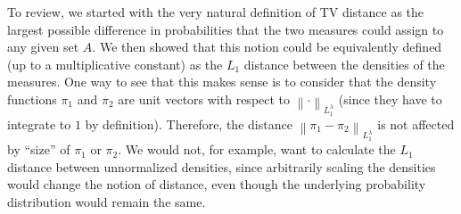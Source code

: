 \documentclass[12pt]{article}
\newcommand*{\norm}[1]{\left\lVert#1\right\rVert}
\begin{document}
To review, we started with the very natural definition of TV distance as the largest possible difference in probabilities that the two measures could assign to any given set $A$. We then showed that this notion could be equivalently defined (up to a multiplicative constant) as the $L_1$ distance between the densities of the measures. One way to see that this makes sense is to consider that the density functions $\pi_1$ and $\pi_2$ are unit vectors with respect to $\norm{\cdot}_{L_1^\lambda}$ (since they have to integrate to $1$ by definition). Therefore, the distance 
$\norm{\pi_1 - \pi_2}_{L_1^\lambda}$ is not affected by ``size'' of $\pi_1$ or $\pi_2$. We would not, for example, want to calculate the $L_1$ distance between unnormalized densities, since arbitrarily scaling the densities would change the notion of distance, even though the underlying probability distribution would remain the same. 
\end{document}
